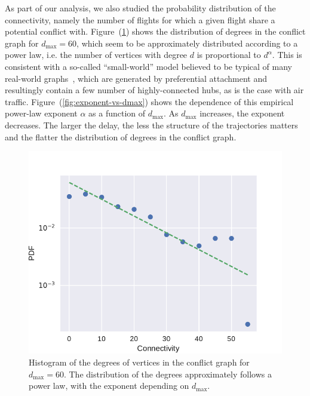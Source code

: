 As part of our analysis, we also studied the probability
distribution of the connectivity, namely the number of flights
for which a given flight share a potential conflict with. 
Figure~(\ref{fig:hist-degree}) shows
the distribution of degrees in the conflict graph for $d_{\max}=60$,
which seem to be approximately distributed according to a power law, i.e. 
the number of vertices with degree $d$ is proportional to $d^{\alpha}$.
This is consistent with a so-called ``small-world'' model believed to be typical of many real-world graphs~\cite{barabasi:99}, which are generated by preferential attachment and resultingly contain a few number of highly-connected hubs, as is the case with air traffic.
Figure~(\ref{fig:exponent-vs-dmax}) shows the dependence of this empirical power-law exponent $\alpha$ as a function of $d_{\max}$.
As $d_{\max}$ increases, the exponent decreases.
The larger the delay, the less the structure of the trajectories matters and the flatter the distribution of degrees in the conflict graph.

\begin{figure}[h]
\includegraphics[width=0.95\columnwidth]{pics/instances/connectivity_pdf.pdf}
\caption[Histogram of degrees]{Histogram of the degrees of vertices in the conflict graph for $d_{\max} = 60$. 
The distribution of the degrees approximately follows a power law, with the exponent depending on $d_{\max}$.
}
\label{fig:hist-degree}
\end{figure}

